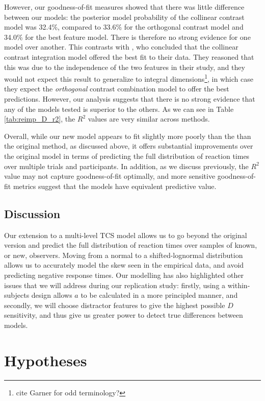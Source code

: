 \documentclass[smallextended, natbib]{svjour3}       %
\begin{document}
However, our goodness-of-fit measures showed that there was little difference between our models: the posterior model probability of the collinear contrast model was 32.4\%, compared to 33.6\% for the orthogonal contrast model and 34.0\% for the best feature model. There is therefore no strong evidence for one model over another. This contrasts with \cite{buetti2019predicting}, who concluded that the collinear contrast integration model offered the best fit to their data. They reasoned that this was due to the independence of the two features in their study, and they would not expect this result to generalize to integral dimensions\footnote{cite Garner for odd terminology?}, in which case they expect the \textit{orthogonal} contrast combination model to offer the best predictions. However, our analysis suggests that there is no strong evidence that any of the models tested is superior to the others. As we can see in Table \ref{tab:reimp_D_r2}, the $R^2$ values are very similar across methods. 

Overall, while our new model appears to fit slightly more poorly than the than the original method, as discussed above, it offers substantial improvements over the original model in terms of predicting the full distribution of reaction times over multiple trials and participants. In addition, as we discuss previously, the $R^2$ value may not capture goodness-of-fit optimally, and more sensitive goodness-of-fit metrics suggest that the models have equivalent predictive value.

\subsection{Discussion}

Our extension to a multi-level TCS model allows us to go beyond the original version and predict the full distribution of reaction times over samples of known, or new, observers. Moving from a normal to a shifted-lognormal distribution allows us to accurately model the skew seen in the empirical data, and avoid predicting negative response times. Our modelling has also highlighted other issues that we will address during our replication study: firstly, using a within-subjects design allows $a$ to be calculated in a more principled manner, and secondly, we will choose distractor features to give the highest possible $D$ sensitivity, and thus give us greater power to detect true differences between models.

\section{Hypotheses}
\end{document}
